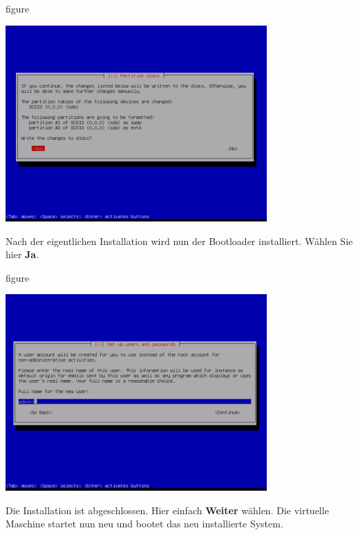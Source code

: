 \begin{nofloat}{figure}
\begin{center}
\includegraphics[width=0.75\textwidth]{screenshots/27_ubuntu_install.png}
\end{center}
\end{nofloat}

Nach der eigentlichen Installation wird nun der Bootloader installiert. Wählen Sie hier \textbf{Ja}.

\begin{nofloat}{figure}
\begin{center}
\includegraphics[width=0.75\textwidth]{screenshots/28_ubuntu_install.png}
\end{center}
\end{nofloat}

\pagebreak
Die Installation ist abgeschlossen. Hier einfach \textbf{Weiter} wählen. Die virtuelle Maschine startet nun neu und
bootet das neu installierte System.

